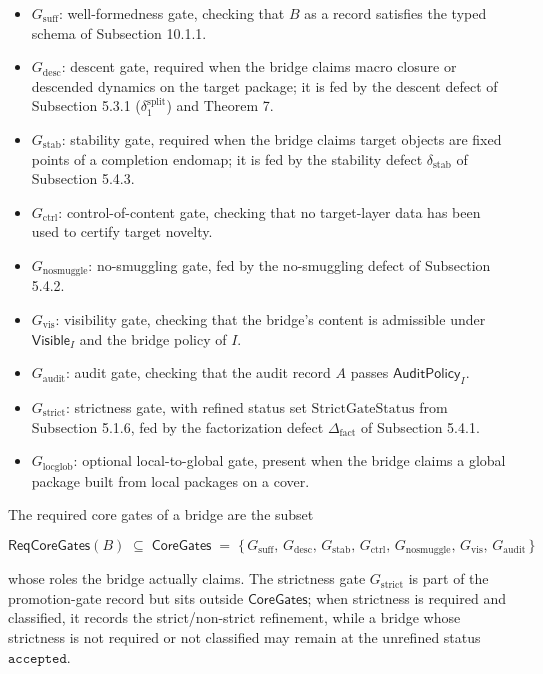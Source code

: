 \documentclass[11pt]{article}
\providecommand{\tightlist}{}
\theoremstyle{definition}
\begin{document}
\begin{itemize}
\tightlist
\item
  \(G_{\mathrm{suff}}\): well-formedness gate, checking that \(B\) as a record satisfies the typed schema of Subsection 10.1.1.
\item
  \(G_{\mathrm{desc}}\): descent gate, required when the bridge claims macro closure or descended dynamics on the target package; it is fed by the descent defect of Subsection 5.3.1 (\(\delta_1^{\mathrm{split}}\)) and Theorem 7.
\item
  \(G_{\mathrm{stab}}\): stability gate, required when the bridge claims target objects are fixed points of a completion endomap; it is fed by the stability defect \(\delta_{\mathrm{stab}}\) of Subsection 5.4.3.
\item
  \(G_{\mathrm{ctrl}}\): control-of-content gate, checking that no target-layer data has been used to certify target novelty.
\item
  \(G_{\mathrm{nosmuggle}}\): no-smuggling gate, fed by the no-smuggling defect of Subsection 5.4.2.
\item
  \(G_{\mathrm{vis}}\): visibility gate, checking that the bridge's content is admissible under \(\mathsf{Visible}_I\) and the bridge policy of \(I\).
\item
  \(G_{\mathrm{audit}}\): audit gate, checking that the audit record \(A\) passes \(\mathsf{AuditPolicy}_I\).
\item
  \(G_{\mathrm{strict}}\): strictness gate, with refined status set \(\mathrm{StrictGateStatus}\) from Subsection 5.1.6, fed by the factorization defect \(\Delta_{\mathrm{fact}}\) of Subsection 5.4.1.
\item
  \(G_{\mathrm{locglob}}\): optional local-to-global gate, present when the bridge claims a global package built from local packages on a cover.
\end{itemize}

The required core gates of a bridge are the subset

\[
\mathsf{ReqCoreGates}(B)\;\subseteq\;\mathsf{CoreGates}\;=\;\{\,G_{\mathrm{suff}},\,G_{\mathrm{desc}},\,G_{\mathrm{stab}},\,G_{\mathrm{ctrl}},\,G_{\mathrm{nosmuggle}},\,G_{\mathrm{vis}},\,G_{\mathrm{audit}}\,\}
\]

whose roles the bridge actually claims. The strictness gate \(G_{\mathrm{strict}}\) is part of the promotion-gate record but sits outside \(\mathsf{CoreGates}\); when strictness is required and classified, it records the strict/non-strict refinement, while a bridge whose strictness is not required or not classified may remain at the unrefined status \(\texttt{accepted}\).
\end{document}
